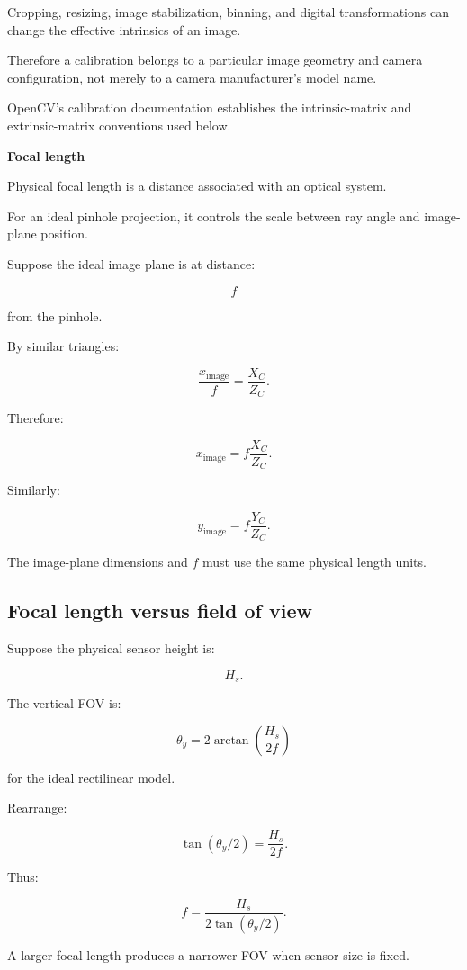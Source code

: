 Cropping, resizing, image stabilization, binning, and digital transformations can change the effective intrinsics of an image.

Therefore a calibration belongs to a particular image geometry and camera configuration, not merely to a camera manufacturer's model name.

OpenCV's calibration documentation establishes the intrinsic-matrix and extrinsic-matrix conventions used below. 

\textbf{Focal length}

Physical focal length is a distance associated with an optical system.

For an ideal pinhole projection, it controls the scale between ray angle and image-plane position.

Suppose the ideal image plane is at distance:

\[
 f
\]

from the pinhole.

By similar triangles:

\[
 \frac{x_{\mathrm{image}}}{f} = \frac{X_C}{Z_C}.
\]

Therefore:

\[
 \boxed{ x_{\mathrm{image}}= f\frac{X_C}{Z_C} }.
\]

Similarly:

\[
 \boxed{ y_{\mathrm{image}}= f\frac{Y_C}{Z_C} }.
\]

The image-plane dimensions and \(f\) must use the same physical length units.

\subsection{Focal length versus field of view}\label{02-foundations-ii-ch034-focal-length-versus-field-of-view}

Suppose the physical sensor height is:

\[
 H_s.
\]

The vertical FOV is:

\[
 \boxed{ \theta_y= 2\arctan\left(\frac{H_s}{2f}\right) }
\]

for the ideal rectilinear model.

Rearrange:

\[
 \tan(\theta_y/2)=\frac{H_s}{2f}.
\]

Thus:

\[
 \boxed{ f=\frac{H_s}{2\tan(\theta_y/2)} }.
\]

A larger focal length produces a narrower FOV when sensor size is fixed.


